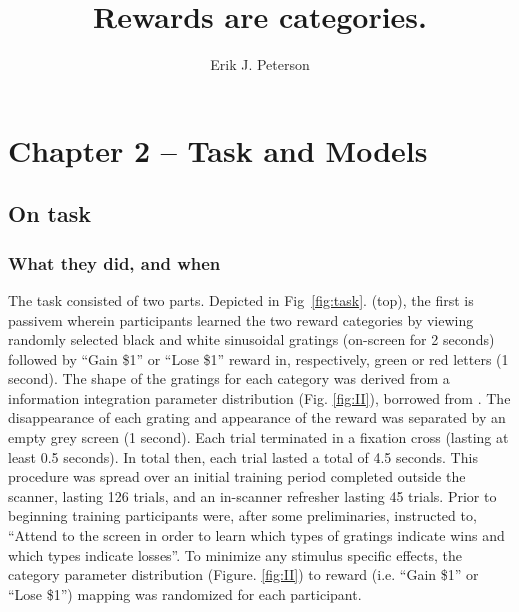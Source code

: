 \documentclass[doc,12pt]{apa}        %
\title{Rewards are categories.}
\author{Erik J. Peterson} \affiliation{Dept. of Psychology \\ Colorado State University \\ Fort Collins, CO}
\begin{document}
 
\maketitle
\doublespacing

\section{Chapter 2 -- Task and Models} %
\label{sec:task_and_models}

\subsection{On task}
\label{sub:to_task}
\subsubsection{What they did, and when}
\label{subsub:whatwhen}
The task consisted of two parts.  Depicted in Fig~\ref{fig:task}. (top), the first is passivem wherein participants learned the two reward categories by viewing randomly selected black and white sinusoidal gratings (on-screen for 2 seconds) followed by ``Gain \$1'' or ``Lose \$1'' reward in, respectively, green or red letters (1 second).  The shape of the gratings for each category was derived from a information integration parameter distribution (Fig. \ref{fig:II}), borrowed from \cite{Spiering:2008p5008}.  The disappearance of each grating and appearance of the reward was separated by an empty grey screen (1 second).  Each trial terminated in a fixation cross (lasting at least 0.5 seconds). In total then, each trial lasted a total of 4.5 seconds.  This procedure was spread over an initial training period completed outside the scanner, lasting 126 trials, and an in-scanner refresher lasting 45 trials.  Prior to beginning training participants were, after some preliminaries, instructed to, ``Attend to the screen in order to learn which types of gratings indicate wins and which types indicate losses''.  To minimize any stimulus specific effects, the category parameter distribution (Figure. \ref{fig:II}) to reward (i.e. ``Gain \$1'' or ``Lose \$1'') mapping was randomized for each participant.
\end{document}
